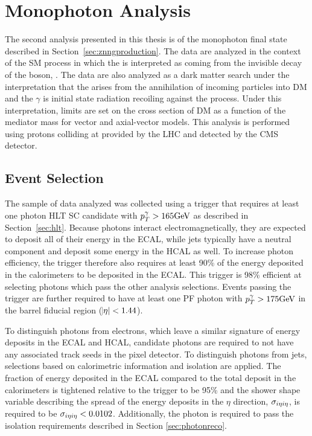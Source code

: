 
\chapter{Monophoton Analysis}\label{sec:lgxc}

 The second analysis presented in this thesis
  is of the monophoton final state described 
  in Section~\ref{sec:znngproduction}.
The data are analyzed in the context of the 
 SM process \ppzgnng  in which the \met is interpreted as coming from the
 invisible decay of the \z boson, \znn.
The data are also analyzed
 as a dark matter search under the interpretation 
 that the \met arises from the 
 annihilation of incoming particles into DM 
 and the $\gamma$ is initial state radiation 
 recoiling against the process. 
Under this interpretation, limits are set on the
 cross section of DM as a function of the 
 mediator mass for vector and axial-vector models. 
This analysis is performed using protons colliding at
  \TeV provided by the LHC and detected by
 the CMS detector.

\section{Event Selection}\label{subsec:lgevent_selection}

The sample of data analyzed was collected using 
 a trigger that requires at least one photon
 HLT SC candidate with $p_T^\gamma > 165 \mathrm{GeV}$
 as described in Section~\ref{sec:hlt}.
Because photons interact electromagnetically, they 
 are expected to deposit all of their energy in the
 ECAL, while jets typically have a neutral component and 
 deposit some energy in the HCAL as well. 
To increase photon efficiency, the trigger therefore also
 requires at least 90\% of the energy deposited in 
 the calorimeters to be deposited in the ECAL.
This trigger is 98\% efficient at selecting photons
 which pass the other analysis selections.
Events passing the trigger are further required to
 have at least one PF photon with $p_T^\gamma > 175\mathrm{GeV}$
 in the barrel fiducial region ($\abs{\eta} < 1.44$).

To distinguish photons from electrons, which leave a similar
 signature of energy deposits in the ECAL and HCAL,
 candidate photons are required
 to not have any associated track seeds in the pixel detector. 
To distinguish photons from jets, selections based on calorimetric
 information and isolation are applied. 
The fraction of energy deposited in the ECAL compared 
 to the total deposit in the calorimeters
 is tightened relative to the trigger to be 95\%
 and the shower shape variable describing the spread
 of the energy deposits in the $\eta$ direction,
  $\sigma_{i\eta i\eta}$, %
 is required to be $\sigma_{i\eta i\eta} < 0.0102$. 
Additionally, the photon is required to pass
 the isolation requirements described in Section \ref{sec:photonreco}.

